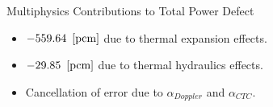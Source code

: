 \begin{frame}{Multiphysics Contributions to Total Power Defect}
  \begin{itemize}
    \item $-559.64~\left[\text{{pcm}}\right]$ due to thermal expansion effects.
    \item $-29.85~\left[\text{{pcm}}\right]$ due to thermal hydraulics effects.
    \item Cancellation of error due to $\alpha_{Doppler}$ and $\alpha_{CTC}$.
  \end{itemize}
  \begin{table}
    \label{tab:multiphysics_worths}
    \centering
  \end{table}
\end{frame}
